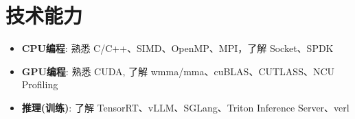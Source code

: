 \section{技术能力}
\begin{itemize}[parsep=0.2ex]
  \item \textbf{CPU编程}: 熟悉 C/C++、SIMD、OpenMP、MPI，了解 Socket、SPDK
  \item \textbf{GPU编程}: 熟悉 CUDA, 了解 wmma/mma、cuBLAS、CUTLASS、NCU Profiling
  \item \textbf{推理(训练)}: 了解 TensorRT、vLLM、SGLang、Triton Inference Server、verl
\end{itemize}
